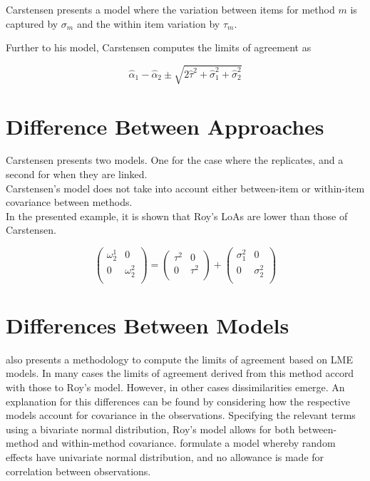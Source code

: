 \documentclass[12pt, a4paper]{report}
\theoremstyle{plain}
\theoremstyle{definition}
\theoremstyle{remark}
\begin{document}
Carstensen presents a model where the variation between items for
method $m$ is captured by $\sigma_m$ and the within item variation
by $\tau_m$.

Further to his model, Carstensen computes the limits of agreement
as

\[
\hat{\alpha}_1 - \hat{\alpha}_2 \pm \sqrt{2 \hat{\tau}^2 +
	\hat{\sigma}^2_1 + \hat{\sigma}^2_2}
\]


















\section{Difference Between Approaches}
Carstensen presents two models. One for the case where the replicates, and a second for when they are linked.\\
Carstensen's model does not take into account either between-item or within-item covariance between methods.\\
In the presented example, it is shown that Roy's LoAs are lower than those of Carstensen.


\[\left(\begin{array}{cc}
\omega^1_2  & 0 \\
0 & \omega^2_2 \\
\end{array}  \right)
=  \left(
\begin{array}{cc}
\tau^2  & 0 \\
0 & \tau^2 \\
\end{array} \right)+
\left(
\begin{array}{cc}
\sigma^2_1  & 0 \\
0 & \sigma^2_2 \\
\end{array}\right)
\]

\newpage
\section{Differences Between Models}
\citet{BXC2008} also presents a methodology to compute the limits of agreement based on LME models. In many cases the limits of agreement derived from this method accord with those to Roy's model. However, in other cases dissimilarities emerge. An explanation for this differences can be found by considering how the respective models account for covariance in the observations. Specifying the relevant terms using a bivariate normal distribution, Roy's model allows for both between-method and within-method covariance. \citet{BXC2008} formulate a model whereby random effects have univariate normal distribution, and no allowance is made for correlation between observations.
\end{document}

